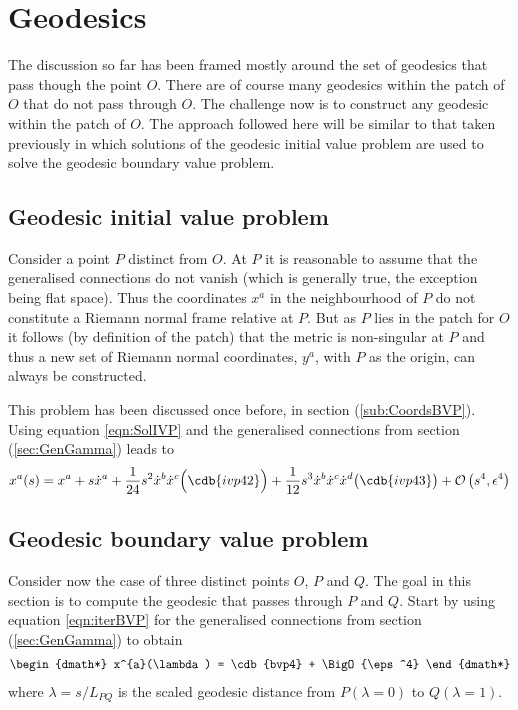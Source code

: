 \documentclass[a4paper,12pt]{article}
\numberwithin{equation}{section}
\begin{document}
\section{Geodesics}\label{sec:GeodesicsRNC}

The discussion so far has been framed mostly around the set of geodesics that pass though
the point $O$. There are of course many geodesics within the patch of $O$ that do not pass
through $O$. The challenge now is to construct any geodesic within the patch of $O$. The
approach followed here will be similar to that taken previously in which solutions of the
geodesic initial value problem are used to solve the geodesic boundary value problem.

\subsection{Geodesic initial value problem}\label{sec:GeodesicIVP}

Consider a point $P$ distinct from $O$. At $P$ it is reasonable to assume that the
generalised connections do not vanish (which is generally true, the exception being flat
space). Thus the coordinates $x^a$ in the neighbourhood of $P$ do not constitute a Riemann
normal frame relative at $P$. But as $P$ lies in the patch for $O$ it follows (by definition
of the patch) that the metric is non-singular at $P$ and thus a new set of Riemann normal
coordinates, $y^a$, with $P$ as the origin, can always be constructed.

This problem has been discussed once before, in section (\ref{sub:CoordsBVP}). Using equation
\eqref{eqn:SolIVP} and the generalised connections from section (\ref{sec:GenGamma}) leads to
%
\begin{dmath*}x^{a}(s)
   = x^{a}
   + s \dotx^{a}
   + \frac{1}{24} s^2 {\Dot x}^b {\Dot x}^c \Bigl(\cdb{ivp42}\Bigr)
   + \frac{1}{12} s^3 {\Dot x}^b {\Dot x}^c {\Dot x}^d \bigl(\cdb{ivp43}\bigr)
   + \BigO{s^4,\eps^4}\end{dmath*}
%
\subsection{Geodesic boundary value problem}\label{sec:GeodesicBVP}

Consider now the case of three distinct points $O$, $P$ and $Q$. The goal in this section is
to compute the geodesic that passes through $P$ and $Q$. Start by using equation
\eqref{eqn:iterBVP} for the generalised connections from section (\ref{sec:GenGamma}) to
obtain
%
\begin{dgroup*}[compact,spread={3pt}]
\begin{dmath*} x^{a}(\lambda) = \cdb{bvp4} + \BigO{\eps^4} \end{dmath*}
\end{dgroup*}
where $\lambda=s/L_{PQ}$ is the scaled geodesic distance from $P(\lambda=0)$ to
$Q(\lambda=1)$.
\end{document}
